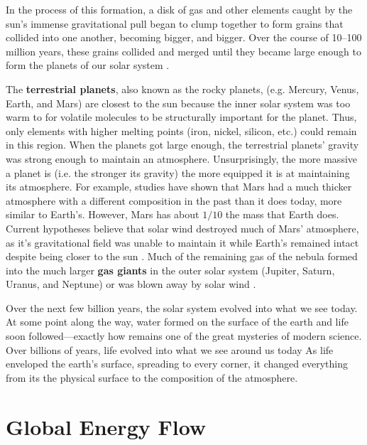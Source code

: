     In the process of this formation, a disk of gas and other elements caught by the sun's immense gravitational pull began to clump together to form grains that collided into one another, becoming bigger, and bigger. Over the course of 10--100 million years, these grains collided and merged until they became large enough to form the planets of our solar system \citep{hayashi1985formation}.

    The \textbf{terrestrial planets}, also known as the rocky planets, (e.g. Mercury, Venus, Earth, and Mars) are closest to the sun because the inner solar system was too warm to for volatile molecules to be structurally important for the planet. Thus, only elements with higher melting points (iron, nickel, silicon, etc.) could remain in this region. When the planets got large enough, the terrestrial planets' gravity was strong enough to maintain an atmosphere. Unsurprisingly, the more massive a planet is (i.e. the stronger its gravity) the more equipped it is at maintaining its atmosphere. For example, studies have shown that Mars had a much thicker atmosphere with a different composition in the past than it does today, more similar to Earth's. However, Mars has about $1/10$ the mass that Earth does. Current hypotheses believe that solar wind destroyed much of Mars' atmosphere, as it's gravitational field was unable to maintain it while Earth's remained intact despite being closer to the sun \citep{owen1992composition}. Much of the remaining gas of the nebula formed into the much larger \textbf{gas giants} in the outer solar system (Jupiter, Saturn, Uranus, and Neptune) or was blown away by solar wind \citep{hayashi1985formation}.

    Over the next few billion years, the solar system evolved into what we see today. At some point along the way, water formed on the surface of the earth and life soon followed---exactly how remains one of the great mysteries of modern science. Over billions of years, life evolved into what we see around us today \citep{bell2015potentially} As life enveloped the earth's surface, spreading to every corner, it changed everything from its the physical surface to the composition of the atmosphere.


    \section{\label{sec:energy_flow}Global Energy Flow}

